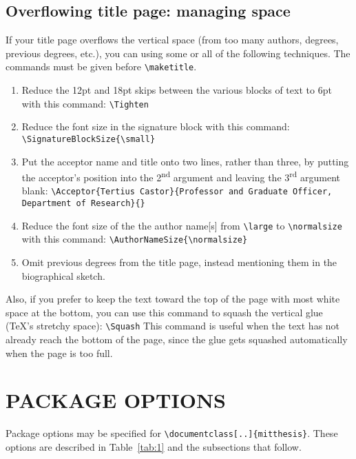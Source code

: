 \documentclass[11pt]{article}
\begin{document}
\subsection*{Overflowing title page: managing space} If your title page overflows the vertical space (from too many authors, degrees, previous degrees, etc.), you can using some or all of the following techniques. The commands must be given before \verb|\maketitle|.
\begin{enumerate}
 \item Reduce the 12pt and 18pt skips between the various blocks of text to 6pt with this command:
	\vskip 5pt
	\noindent\verb|\Tighten|
 \item Reduce the font size in the signature block with this command:
	\vskip 5pt
	\noindent\verb|\SignatureBlockSize{\small}| 
 \item Put the acceptor name and title onto two lines, rather than three, by putting the acceptor's position into the 2\textsuperscript{nd} argument and leaving the 3\textsuperscript{rd} argument blank:
	\vskip 5pt
	{\small\noindent\verb|\Acceptor{Tertius Castor}{Professor and Graduate Officer, Department of Research}{}|}
 \item Reduce the font size of the the author name[s] from \verb|\large| to \verb|\normalsize| with this command:
	\vskip 5pt
	\noindent\verb|\AuthorNameSize{\normalsize}|
 \item Omit previous degrees from the title page, instead mentioning them in the biographical sketch.
\end{enumerate}

Also, if you prefer to keep the text toward the top of the page with most white space at the bottom, you
can use this command to squash the vertical glue (\TeX's stretchy space):
	\vskip 5pt
	\quad\verb|\Squash| 
	\vskip 5pt
\noindent This command is useful when the text has not already reach the bottom of the page, since the glue gets squashed automatically when the page is too full.

\section*{PACKAGE OPTIONS}
Package options may be specified for \verb|\documentclass[..]{mitthesis}|. These options are described in Table~\ref{tab:1} and the subsections that follow.
\end{document}
